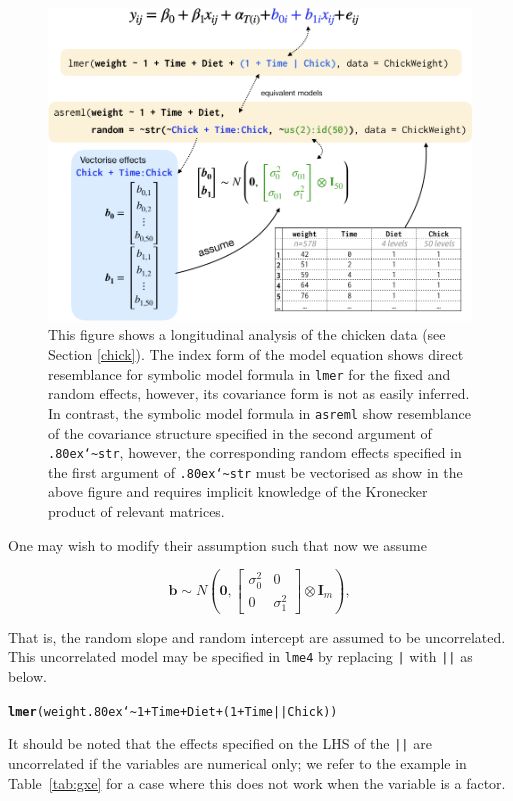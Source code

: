 \documentclass[runningheads]{llncs}\usepackage[]{graphicx}\usepackage[]{color}
\makeatletter
\newcommand{\hlnum}[1]{\textcolor[rgb]{0.686,0.059,0.569}{#1}}%
\newcommand{\hlopt}[1]{\textcolor[rgb]{0,0,0}{#1}}%
\newcommand{\hlstd}[1]{\textcolor[rgb]{0.345,0.345,0.345}{#1}}%
\newcommand{\hlkwd}[1]{\textcolor[rgb]{0.737,0.353,0.396}{\textbf{#1}}}%
\newenvironment{kframe}{%
 \def\at@end@of@kframe{}%
 \ifinner\ifhmode%
  \def\at@end@of@kframe{\end{minipage}}%
  \begin{minipage}{\columnwidth}%
 \fi\fi%
 \def\FrameCommand##1{\hskip\@totalleftmargin \hskip-\fboxsep
 \colorbox{shadecolor}{##1}\hskip-\fboxsep
     \hskip-\linewidth \hskip-\@totalleftmargin \hskip\columnwidth}%
 \MakeFramed {\advance\hsize-\width
   \@totalleftmargin\z@ \linewidth\hsize
   \@setminipage}}%
 {\par\unskip\endMakeFramed%
 \at@end@of@kframe}
\newenvironment{knitrout}{}{} %
\newcommand{\mytilde}{\lower.80ex\hbox{\char`\~}}
\makeatother
\begin{document}
\begin{figure}
	\includegraphics[width=0.9\linewidth,fbox]{images/symbolic_lmm} \caption{This figure shows a longitudinal analysis of the chicken data (see Section \ref{chick}). The index form of the model equation shows direct resemblance for symbolic model formula in \texttt{lmer} for the fixed and random effects, however, its covariance form is not as easily inferred. In contrast, the symbolic model formula in \texttt{asreml} show resemblance of the covariance structure specified in the second argument of \texttt{\mytilde str}, however, the corresponding random effects specified in the first argument of \texttt{\mytilde str} must be vectorised as show in the above figure and requires implicit knowledge of the Kronecker product of relevant matrices. }\label{fig:symbolic-lmm}
\end{figure}


One may wish to modify their assumption such that now we assume

$$\boldsymbol{b}  \sim N\left(\boldsymbol{0}, \begin{bmatrix}\sigma_0^2 & 0 \\ 0 & \sigma^2_1\end{bmatrix}\otimes \mathbf{I}_{m} \right),$$

That is, the random slope and random intercept are assumed to be uncorrelated. This uncorrelated model may be specified in \texttt{lme4} by replacing \texttt{|} with \texttt{||} as below.
\begin{knitrout}
	\color{fgcolor}\begin{kframe}
		\begin{alltt}
			\hlkwd{lmer}\hlstd{(weight} \hlopt{\mytilde} \hlnum{1} \hlopt{+} \hlstd{Time} \hlopt{+} \hlstd{Diet} \hlopt{+} \hlstd{(}\hlnum{1} \hlopt{+} \hlstd{Time} \hlopt{||} \hlstd{Chick))}
		\end{alltt}
	\end{kframe}
\end{knitrout}
It should be noted that the effects specified on the LHS of the \texttt{||} are uncorrelated if the variables are numerical only; we refer to the example in Table~\ref{tab:gxe} for a case where this does not work when the variable is a factor.
\end{document}
